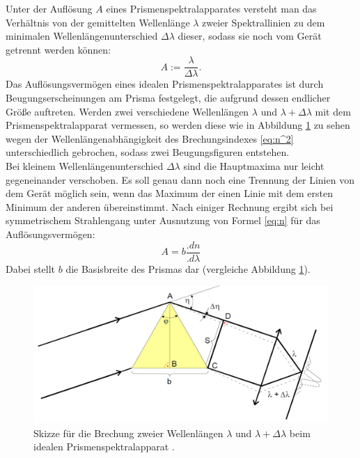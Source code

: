 Unter der Auflösung $A$ eines Prismenspektralapparates versteht man das Verhältnis von der gemittelten Wellenlänge $\lambda$ zweier Spektrallinien zu dem minimalen Wellenlängenunterschied $\Delta\lambda$ dieser, sodass sie noch vom Gerät getrennt werden können:
\[
A := \frac{\lambda}{\Delta\lambda}\text{.}
\]
Das Auflösungsvermögen eines idealen Prismenspektralapparates ist durch Beugungserscheinungen am Prisma festgelegt, die aufgrund dessen endlicher Größe auftreten. Werden zwei verschiedene Wellenlängen $\lambda$ und $\lambda +\Delta\lambda$ mit dem Prismenspektralapparat vermessen, so werden diese wie in Abbildung \ref{fig:Aufloesungsvermoegen} zu sehen wegen der Wellenlängenabhängigkeit des Brechungsindexes \eqref{eq:n^2} unterschiedlich gebrochen, sodass zwei Beugungsfiguren entstehen.\\
Bei kleinem Wellenlängenunterschied $\Delta\lambda$ sind die Hauptmaxima nur leicht gegeneinander verschoben. Es soll genau dann noch eine Trennung der Linien von dem Gerät möglich sein, wenn das Maximum der einen Linie mit dem ersten Minimum der anderen übereinstimmt. Nach einiger Rechnung ergibt sich bei symmetrischem Strahlengang unter Ausnutzung von Formel \eqref{eq:n} für das Auflösungsvermögen:
\begin{equation}
A = b\frac{.dn}{.d\lambda}
\end{equation}   
Dabei stellt $b$ die Basisbreite des Prismas dar (vergleiche Abbildung \ref{fig:Aufloesungsvermoegen}). 

\begin{figure}
\centering
\includegraphics[width=\linewidth-50pt,height=\textheight-50pt,keepaspectratio]{content/images/Aufloesungsvermoegen.png}
\caption{Skizze für die Brechung zweier Wellenlängen $\lambda$ und $\lambda +\Delta\lambda$ beim idealen Prismenspektralapparat \cite{V402}.}
\label{fig:Aufloesungsvermoegen}
\end{figure}



